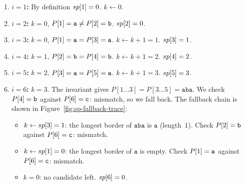 \begin{enumerate}[noitemsep, topsep=3pt]
  \item \textbf{$i=1$:} By definition $sp\kern0pt[1] = 0$. $k \gets 0$.
  \item \textbf{$i=2$:} $k=0$, $P\kern0pt[1]=\texttt{a} \neq P\kern0pt[2]=\texttt{b}$. $sp\kern0pt[2] = 0$.
  \item \textbf{$i=3$:} $k=0$, $P\kern0pt[1]=\texttt{a} = P\kern0pt[3]=\texttt{a}$. $k \gets k+1 = 1$. $sp\kern0pt[3] = 1$.
  \item \textbf{$i=4$:} $k=1$, $P\kern0pt[2]=\texttt{b} = P\kern0pt[4]=\texttt{b}$. $k \gets k+1 = 2$. $sp\kern0pt[4] = 2$.
  \item \textbf{$i=5$:} $k=2$, $P\kern0pt[3]=\texttt{a} = P\kern0pt[5]=\texttt{a}$. $k \gets k+1 = 3$. $sp\kern0pt[5] = 3$.
  \item \textbf{$i=6$:} $k=3$.
        The invariant gives $P[1\ldots 3] = P[3\ldots 5] = \texttt{aba}$.
        We check $P\kern0pt[4]=\texttt{b}$ against $P\kern0pt[6]=\texttt{c}$: mismatch, so we fall back.
        The fallback chain is shown in Figure~\ref{fig:sp-fallback-trace}:
        \begin{itemize}[noitemsep, topsep=2pt]
          \item $k \gets sp\kern0pt[3] = 1$: the longest border of $\texttt{aba}$ is $\texttt{a}$
                (length~$1$). Check $P\kern0pt[2]=\texttt{b}$ against $P\kern0pt[6]=\texttt{c}$: mismatch.
          \item $k \gets sp\kern0pt[1] = 0$: the longest border of $\texttt{a}$ is empty.
                Check $P\kern0pt[1]=\texttt{a}$ against $P\kern0pt[6]=\texttt{c}$: mismatch.
          \item $k=0$: no candidate left. $sp\kern0pt[6] = 0$.
        \end{itemize}

\begin{figure}[H]
\centering
{}
\end{figure}
\end{enumerate}
